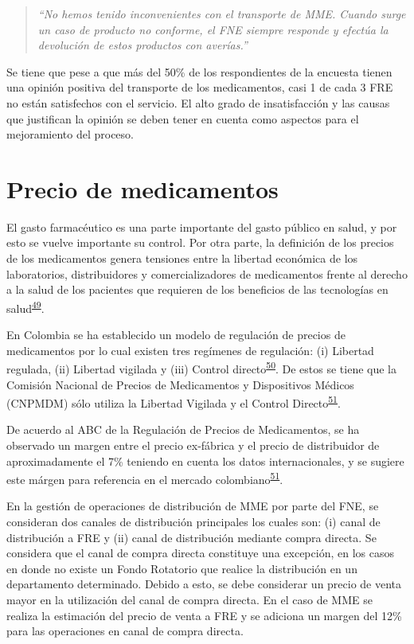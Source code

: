\documentclass[
]{book}
\begin{document}
\begin{quote}
\emph{``No hemos tenido inconvenientes con el transporte de MME. Cuando surge un caso de producto no conforme, el FNE siempre responde y efectúa la devolución de estos productos con averías.''}
\end{quote}

Se tiene que pese a que más del 50\% de los respondientes de la encuesta tienen una opinión positiva del transporte de los medicamentos, casi 1 de cada 3 FRE no están satisfechos con el servicio. El alto grado de insatisfacción y las causas que justifican la opinión se deben tener en cuenta como aspectos para el mejoramiento del proceso.

\hypertarget{precioMedicamentos}{%
\section{Precio de medicamentos}\label{precioMedicamentos}}


El gasto farmacéutico es una parte importante del gasto público en salud, y por esto se vuelve importante su control. Por otra parte, la definición de los precios de los medicamentos genera tensiones entre la libertad económica de los laboratorios, distribuidores y comercializadores de medicamentos frente al derecho a la salud de los pacientes que requieren de los beneficios de las tecnologías en salud\textsuperscript{\protect\hyperlink{ref-AvilaRoncancio2019}{49}}.

En Colombia se ha establecido un modelo de regulación de precios de medicamentos por lo cual existen tres regímenes de regulación: (i) Libertad regulada, (ii) Libertad vigilada y (iii) Control directo\textsuperscript{\protect\hyperlink{ref-CongresodelaRepublicadeColombia1988}{50}}. De estos se tiene que la Comisión Nacional de Precios de Medicamentos y Dispositivos Médicos (CNPMDM) sólo utiliza la Libertad Vigilada y el Control Directo\textsuperscript{\protect\hyperlink{ref-SecretariaTecnicaCNPDM-2019}{51}}.

De acuerdo al ABC de la Regulación de Precios de Medicamentos, se ha observado un margen entre el precio ex-fábrica y el precio de distribuidor de aproximadamente el 7\% teniendo en cuenta los datos internacionales, y se sugiere este márgen para referencia en el mercado colombiano\textsuperscript{\protect\hyperlink{ref-SecretariaTecnicaCNPDM-2019}{51}}.

En la gestión de operaciones de distribución de MME por parte del FNE, se consideran dos canales de distribución principales los cuales son: (i) canal de distribución a FRE y (ii) canal de distribución mediante compra directa. Se considera que el canal de compra directa constituye una excepción, en los casos en donde no existe un Fondo Rotatorio que realice la distribución en un departamento determinado. Debido a esto, se debe considerar un precio de venta mayor en la utilización del canal de compra directa. En el caso de MME se realiza la estimación del precio de venta a FRE y se adiciona un margen del 12\% para las operaciones en canal de compra directa.
\end{document}
